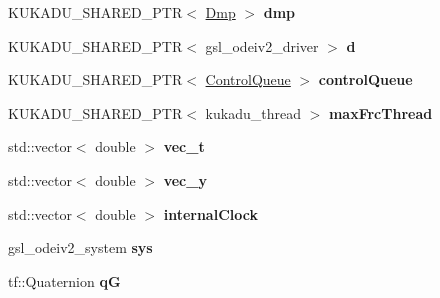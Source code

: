\begin{DoxyCompactItemize}
\item 
K\+U\+K\+A\+D\+U\+\_\+\+S\+H\+A\+R\+E\+D\+\_\+\+P\+TR$<$ \hyperlink{classkukadu_1_1Dmp}{Dmp} $>$ {\bfseries dmp}\hypertarget{classkukadu_1_1DMPExecutor_a86ae6f53f67b0bc48e3973f587bd1dc1}{}\label{classkukadu_1_1DMPExecutor_a86ae6f53f67b0bc48e3973f587bd1dc1}

\item 
K\+U\+K\+A\+D\+U\+\_\+\+S\+H\+A\+R\+E\+D\+\_\+\+P\+TR$<$ gsl\+\_\+odeiv2\+\_\+driver $>$ {\bfseries d}\hypertarget{classkukadu_1_1DMPExecutor_a08fe6c0abe03d902f7899691c8010594}{}\label{classkukadu_1_1DMPExecutor_a08fe6c0abe03d902f7899691c8010594}

\item 
K\+U\+K\+A\+D\+U\+\_\+\+S\+H\+A\+R\+E\+D\+\_\+\+P\+TR$<$ \hyperlink{classkukadu_1_1ControlQueue}{Control\+Queue} $>$ {\bfseries control\+Queue}\hypertarget{classkukadu_1_1DMPExecutor_abf8c7b74c313d23e33499816d5c0a371}{}\label{classkukadu_1_1DMPExecutor_abf8c7b74c313d23e33499816d5c0a371}

\item 
K\+U\+K\+A\+D\+U\+\_\+\+S\+H\+A\+R\+E\+D\+\_\+\+P\+TR$<$ kukadu\+\_\+thread $>$ {\bfseries max\+Frc\+Thread}\hypertarget{classkukadu_1_1DMPExecutor_a076fb3450f41f77de451784689f33116}{}\label{classkukadu_1_1DMPExecutor_a076fb3450f41f77de451784689f33116}

\item 
std\+::vector$<$ double $>$ {\bfseries vec\+\_\+t}\hypertarget{classkukadu_1_1DMPExecutor_ab202defc67dd1ca63492dd35a53796bf}{}\label{classkukadu_1_1DMPExecutor_ab202defc67dd1ca63492dd35a53796bf}

\item 
std\+::vector$<$ double $>$ {\bfseries vec\+\_\+y}\hypertarget{classkukadu_1_1DMPExecutor_a254a09001b3b233b155657ef39c2f5ac}{}\label{classkukadu_1_1DMPExecutor_a254a09001b3b233b155657ef39c2f5ac}

\item 
std\+::vector$<$ double $>$ {\bfseries internal\+Clock}\hypertarget{classkukadu_1_1DMPExecutor_aed2068ec0e2086b7979a5f7efa9cb3d6}{}\label{classkukadu_1_1DMPExecutor_aed2068ec0e2086b7979a5f7efa9cb3d6}

\item 
gsl\+\_\+odeiv2\+\_\+system {\bfseries sys}\hypertarget{classkukadu_1_1DMPExecutor_a073f76c053591ab8d1e9a845aae8cf18}{}\label{classkukadu_1_1DMPExecutor_a073f76c053591ab8d1e9a845aae8cf18}

\item 
tf\+::\+Quaternion {\bfseries qG}\hypertarget{classkukadu_1_1DMPExecutor_a55dfbfd07fe7b5d85fccc5f0a2004d9c}{}\label{classkukadu_1_1DMPExecutor_a55dfbfd07fe7b5d85fccc5f0a2004d9c}


\end{DoxyCompactItemize}
